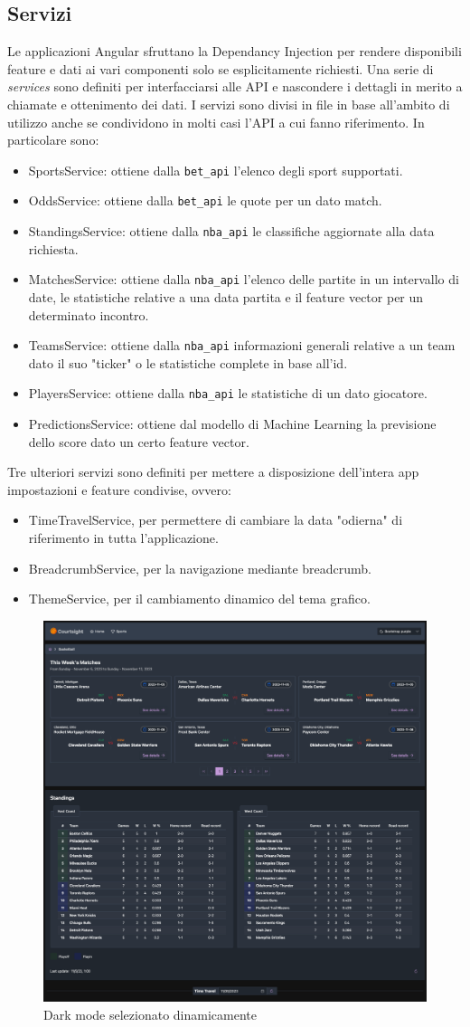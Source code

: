 \subsection{Servizi}
Le applicazioni Angular sfruttano la Dependancy Injection per rendere disponibili feature e dati ai vari componenti solo se esplicitamente richiesti. Una serie di \textit{services} sono definiti per interfacciarsi alle API e nascondere i dettagli in merito a chiamate e ottenimento dei dati.
I servizi sono divisi in file in base all'ambito di utilizzo anche se condividono in molti casi l'API a cui fanno riferimento. In particolare sono:
\begin{itemize}
    \item SportsService: ottiene dalla \texttt{bet\_api} l'elenco degli sport supportati.
    \item OddsService: ottiene dalla \texttt{bet\_api} le quote per un dato match.
    \item StandingsService: ottiene dalla \texttt{nba\_api} le classifiche aggiornate alla data richiesta.
    \item MatchesService: ottiene dalla \texttt{nba\_api} l'elenco delle partite in un intervallo di date, le statistiche relative a una data partita e il feature vector per un determinato incontro.
    \item TeamsService: ottiene dalla \texttt{nba\_api} informazioni generali relative a un team dato il suo "ticker" o le statistiche complete in base all'id.
    \item PlayersService: ottiene dalla \texttt{nba\_api} le statistiche di un dato giocatore.
    \item PredictionsService: ottiene dal modello di Machine Learning la previsione dello score dato un certo feature vector.
\end{itemize}
Tre ulteriori servizi sono definiti per mettere a disposizione dell'intera app impostazioni e feature condivise, ovvero:
\begin{itemize}
    \item TimeTravelService, per permettere di cambiare la data "odierna" di riferimento in tutta l'applicazione.
    \item BreadcrumbService, per la navigazione mediante breadcrumb.
    \item ThemeService, per il cambiamento dinamico del tema grafico.
\end{itemize}
\begin{figure}[H]
    \centering
    \includegraphics[width=0.75\linewidth]{img/webapp/themes.png}
    \caption{Dark mode selezionato dinamicamente}
    \label{fig:enter-label}
\end{figure}

